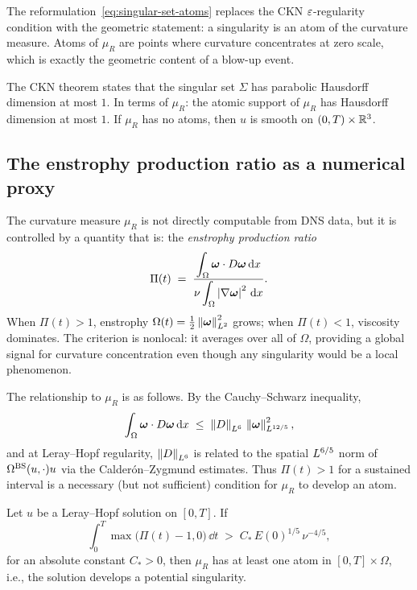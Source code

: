 The reformulation~\eqref{eq:singular-set-atoms} replaces the CKN $\varepsilon$-regularity
condition with the geometric statement: a singularity is an atom of the curvature measure.
Atoms of $\mu_R$ are points where curvature concentrates at zero scale, which is exactly
the geometric content of a blow-up event.

\begin{remark}\label{rem:hausdorff-dim}
  The CKN theorem states that the singular set $\Sigma$ has parabolic Hausdorff
  dimension at most $1$.  In terms of $\mu_R$: the atomic support of $\mu_R$ has
  Hausdorff dimension at most $1$.  If $\mu_R$ has no atoms, then $u$ is smooth
  on $(0,T)\times\mathbb{R}^3$.
\end{remark}

\subsection{The enstrophy production ratio as a numerical proxy}

The curvature measure $\mu_R$ is not directly computable from DNS data, but it is
controlled by a quantity that is: the \emph{enstrophy production ratio}
\begin{equation}\label{eq:enstrophy-ratio}
  \Pi(t)
  \;=\;
  \frac{\displaystyle\int_\Omega \boldsymbol{\omega}\cdot D\boldsymbol{\omega}\,\mathrm{d} x}
       {\displaystyle\nu\int_\Omega \left\lvert \nabla\boldsymbol{\omega} \right\rvert^2\,\mathrm{d} x}.
\end{equation}
When $\Pi(t) > 1$, enstrophy $\Omega(t) = \tfrac{1}{2}\left\lVert \boldsymbol{\omega} \right\rVert^2_{L^{2}}$
grows; when $\Pi(t) < 1$, viscosity dominates.  The criterion is nonlocal:
it averages over all of $\Omega$, providing a global signal for curvature concentration
even though any singularity would be a local phenomenon.

The relationship to $\mu_R$ is as follows.  By the Cauchy--Schwarz inequality,
\[
  \int_\Omega \boldsymbol{\omega}\cdot D\boldsymbol{\omega}\,\mathrm{d} x
  \;\leq\;
  \left\lVert D \right\rVert_{L^{6}}\,\left\lVert \boldsymbol{\omega} \right\rVert^2_{L^{12/5}},
\]
and at Leray--Hopf regularity, $\left\lVert D \right\rVert_{L^{6}}$ is related to the spatial
$L^{6/5}$ norm of $\Omega^{\mathrm{BS}}(u,\cdot)u$ via the Calder\'{o}n--Zygmund estimates.
Thus $\Pi(t) > 1$ for a sustained interval is a necessary (but not sufficient)
condition for $\mu_R$ to develop an atom.

\begin{conjecture}\label{conj:concentration}
  Let $u$ be a Leray--Hopf solution on $[0,T]$.  If
  \begin{equation}\label{eq:concentration-criterion}
    \int_0^T \max\bigl(\Pi(t) - 1, 0\bigr)\,\dd t \;>\; C_*\,E(0)^{1/5}\,\nu^{-4/5},
  \end{equation}
  for an absolute constant $C_* > 0$, then $\mu_R$ has at least one atom in
  $[0,T]\times\Omega$, i.e., the solution develops a potential singularity.
\end{conjecture}

